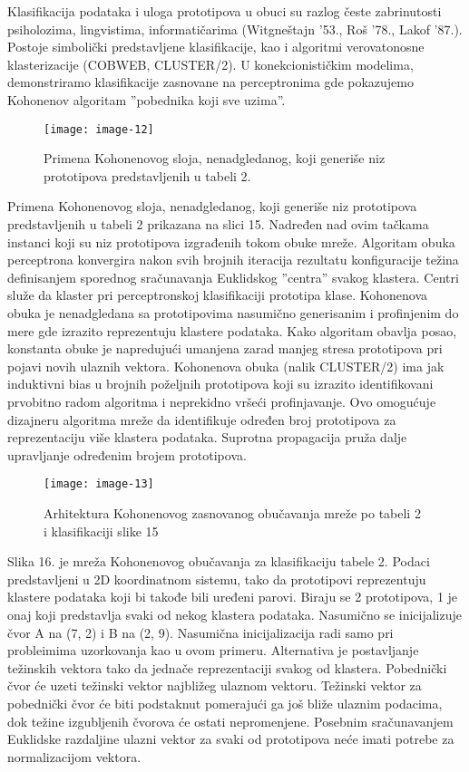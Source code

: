 \documentclass[fontsize=11bp, paper=a4]{scrarticle}
\begin{document}
Klasifikacija podataka i uloga prototipova u obuci su razlog česte zabrinutosti psiholozima, lingvistima, informatičarima (Witgneštajn '53., Roš '78., Lakof '87.). 
Postoje simbolički predstavljene klasifikacije, kao i algoritmi verovatonosne klasterizacije (COBWEB, CLUSTER/2\cite{clustering}). U konekcionističkim modelima, demonstriramo klasifikacije zasnovane na perceptronima gde pokazujemo Kohonenov algoritam ''pobednika koji sve uzima''.
\begin{figure}[h!]
    \centering
    \texttt{[image: image-12]}
    \caption{Primena Kohonenovog sloja, nenadgledanog, koji generiše niz prototipova predstavljenih u tabeli 2.}
\end{figure}
Primena Kohonenovog sloja, nenadgledanog, koji generiše niz prototipova predstavljenih u tabeli 2 prikazana na slici 15. Nadređen nad ovim tačkama instanci koji su niz prototipova izgrađenih tokom obuke mreže. Algoritam obuka perceptrona konvergira nakon svih brojnih iteracija rezultatu konfiguracije težina definisanjem sporednog sračunavanja Euklidskog ''centra'' svakog klastera. Centri služe da klaster pri perceptronskoj klasifikaciji prototipa klase. Kohonenova obuka je nenadgledana sa prototipovima nasumično generisanim i profinjenim do mere gde izrazito reprezentuju klastere podataka. Kako algoritam obavlja posao, konstanta obuke je napredujući umanjena zarad manjeg stresa prototipova pri pojavi novih ulaznih vektora. Kohonenova obuka (nalik CLUSTER/2) ima jak induktivni bias u brojnih poželjnih prototipova koji su izrazito identifikovani prvobitno radom algoritma i neprekidno vršeći profinjavanje. Ovo omogućuje dizajneru algoritma mreže da identifikuje određen broj prototipova za reprezentaciju više klastera podataka. Suprotna propagacija pruža dalje upravljanje određenim brojem prototipova.

\begin{figure}[h!]
    \centering
    \texttt{[image: image-13]}
    \caption{Arhitektura Kohonenovog zasnovanog obučavanja mreže po tabeli 2 i klasifikaciji slike 15}
\end{figure}
Slika 16. je mreža Kohonenovog obučavanja za klasifikaciju tabele 2. Podaci predstavljeni u 2D koordinatnom sistemu, tako da prototipovi reprezentuju klastere podataka koji bi takođe bili uređeni parovi. Biraju se 2 prototipova, 1 je onaj koji predstavlja svaki od nekog klastera podataka. Nasumično se inicijalizuje čvor A na (7, 2) i B na (2, 9). Nasumična inicijalizacija radi samo pri probleimima uzorkovanja kao u ovom primeru. Alternativa je postavljanje težinskih vektora tako da jednače reprezentaciji svakog od klastera. Pobednički čvor će uzeti težinski vektor najbližeg ulaznom vektoru. Težinski vektor za pobednički čvor će biti podstaknut pomerajući ga još bliže ulaznim podacima, dok težine izgubljenih čvorova će ostati nepromenjene. Posebnim sračunavanjem Euklidske razdaljine ulazni vektor za svaki od prototipova neće imati potrebe za normalizacijom vektora.
\end{document}
